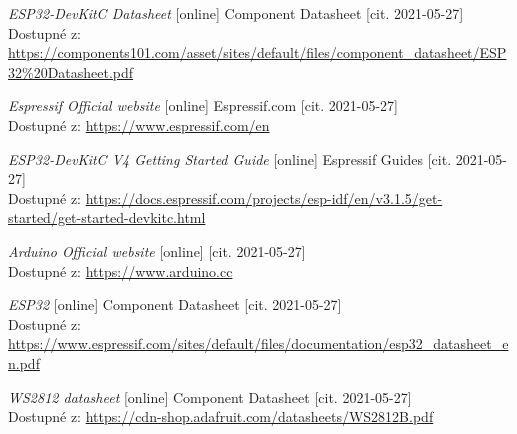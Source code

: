  \newpage

 \label{liter}
 \begin{thebibliography}{99}





\textit{ESP32-DevKitC Datasheet} [online] Component Datasheet [cit. 2021-05-27] \\
Dostupné z: \url{https://components101.com/asset/sites/default/files/component_datasheet/ESP32%20Datasheet.pdf}



\textit{Espressif Official website} [online] Espressif.com [cit. 2021-05-27] \\
Dostupné z: \url{https://www.espressif.com/en}

\textit{ESP32-DevKitC V4 Getting Started Guide} [online] Espressif Guides [cit. 2021-05-27] \\
Dostupné z: \url{https://docs.espressif.com/projects/esp-idf/en/v3.1.5/get-started/get-started-devkitc.html}

\textit{Arduino Official website} [online] [cit. 2021-05-27] \\
Dostupné z: \url{https://www.arduino.cc}

\textit{ESP32} [online] Component Datasheet [cit. 2021-05-27] \\
Dostupné z: \url{https://www.espressif.com/sites/default/files/documentation/esp32_datasheet_en.pdf} 


\textit{WS2812 datasheet} [online] Component Datasheet [cit. 2021-05-27] \\
Dostupné z: \url{https://cdn-shop.adafruit.com/datasheets/WS2812B.pdf}


\end{thebibliography}
